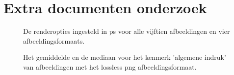 \section{Extra documenten onderzoek}
\label{sec:bijlages-onderzoek}

\FloatBarrier
\begin{figure}[h!]
	\centering
	\caption{De renderopties ingesteld in \gls{ps} voor alle vijftien afbeeldingen en vier \glspl{afbeeldingsformaat}.}
	\label{fig:bijlages-onderzoek-render}
\end{figure}
\FloatBarrier

\FloatBarrier
\begin{figure}[h!]
	\centering
	\caption{Het gemiddelde en de mediaan voor het kenmerk 'algemene indruk' van afbeeldingen met het \gls{lossless} \gls{png} afbeeldingsformaat.}
	\label{fig:bijlages-onderzoek-resultaten-png-gem-med}
\end{figure}
\FloatBarrier

